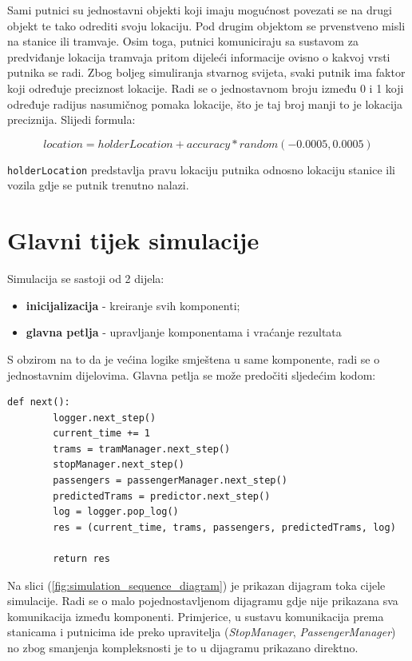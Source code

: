 \documentclass[times, utf8, diplomski]{fer}
\begin{document}
Sami putnici su jednostavni objekti koji imaju mogućnost povezati se na drugi objekt te tako odrediti svoju lokaciju. Pod drugim objektom se prvenstveno misli na stanice ili tramvaje. Osim toga, putnici komuniciraju sa sustavom za predviđanje lokacija tramvaja pritom dijeleći informacije ovisno o kakvoj vrsti putnika se radi. Zbog boljeg simuliranja stvarnog svijeta, svaki putnik ima faktor koji određuje preciznost lokacije. Radi se o jednostavnom broju između 0 i 1 koji određuje radijus nasumičnog pomaka lokacije, što je taj broj manji to je lokacija preciznija. Slijedi formula:

\begin{equation} \label{formula:passenger_location}
    location = holderLocation + accuracy * random(-0.0005, 0.0005)
\end{equation}

\texttt{holderLocation} predstavlja pravu lokaciju putnika odnosno lokaciju stanice ili vozila gdje se putnik trenutno nalazi. 


\section{Glavni tijek simulacije}
Simulacija se sastoji od 2 dijela:
\begin{itemize}
    \item \textbf{inicijalizacija} - kreiranje svih komponenti;
    \item \textbf{glavna petlja} - upravljanje komponentama i vraćanje rezultata
\end{itemize}

S obzirom na to da je većina logike smještena u same komponente, radi se o jednostavnim dijelovima. Glavna petlja se može predočiti sljedećim kodom:
\begin{lstlisting}[caption={Glavna petlja simulacije},captionpos=b,label={kod:simulation_next}]
    def next():
        logger.next_step()
        current_time += 1
        trams = tramManager.next_step()
        stopManager.next_step()
        passengers = passengerManager.next_step()
        predictedTrams = predictor.next_step()
        log = logger.pop_log()
        res = (current_time, trams, passengers, predictedTrams, log)

        return res
\end{lstlisting}



Na slici (\ref{fig:simulation_sequence_diagram}) je prikazan dijagram toka cijele simulacije. 
Radi se o malo pojednostavljenom dijagramu gdje nije prikazana sva komunikacija između komponenti. Primjerice, u sustavu komunikacija prema stanicama i putnicima ide preko upravitelja (\emph{StopManager}, \emph{PassengerManager}) no zbog smanjenja kompleksnosti je to u dijagramu prikazano direktno. \\\\\\\\\\\\\\\\\\\\
\end{document}
